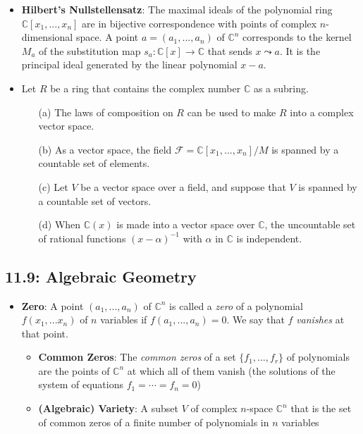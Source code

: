 \documentclass[12pt]{article}
\begin{document}
\begin{itemize}
\begin{enumerate}
  \end{enumerate}
  \item \textbf{Hilbert's Nullstellensatz}: The maximal ideals of the polynomial ring $\mathbb{C}[x_1, ..., x_n]$ are in bijective correspondence with points of complex $n$-dimensional space. A point $a = (a_1,...,a_n)$ of $\mathbb{C}^n$ corresponds to the kernel $M_a$ of the substitution map $s_a: \mathbb{C}[x] \to \mathbb{C}$ that sends $x \leadsto a$. It is the principal ideal generated by the linear polynomial $x - a$.
  \item Let $R$ be a ring that contains the complex number $\mathbb{C}$ as a subring.
  \begin{enumerate}
    \item[(a)] The laws of composition on $R$ can be used to make $R$ into a complex vector space.
    \item[(b)] As a vector space, the field $\mathcal{F} = \mathbb{C}[x_1,...,x_n]/M$ is spanned by a countable set of elements.
    \item[(c)] Let $V$ be a vector space over a field, and suppose that $V$ is spanned by a countable set of vectors.
    \item[(d)] When $\mathbb{C}(x)$ is made into a vector space over $\mathbb{C}$, the uncountable set of rational functions $(x - \alpha)^{-1}$ with $\alpha$ in $\mathbb{C}$ is independent.
  \end{enumerate}
\end{itemize}

\subsection*{11.9: Algebraic Geometry}
\begin{itemize}
  \item \textbf{Zero}: A point $(a_1,...,a_n)$ of $\mathbb{C}^n$ is called a \textit{zero} of a polynomial $f(x_1,...x_n)$ of $n$ variables if $f(a_1,...,a_n) = 0$. We say that $f$ \textit{vanishes} at that point.
  \begin{itemize}
    \item \textbf{Common Zeros}: The \textit{common zeros} of a set $\{f_1,...,f_r\}$ of polynomials are the points of $\mathbb{C}^n$ at which all of them vanish (the solutions of the system of equations $f_1 = \cdots = f_n = 0$)
    \item \textbf{(Algebraic) Variety}: A subset $V$ of complex $n$-space $\mathbb{C}^n$ that is the set of common zeros of a finite number of polynomials in $n$ variables
  \end{itemize}
\end{itemize}
\end{document}
